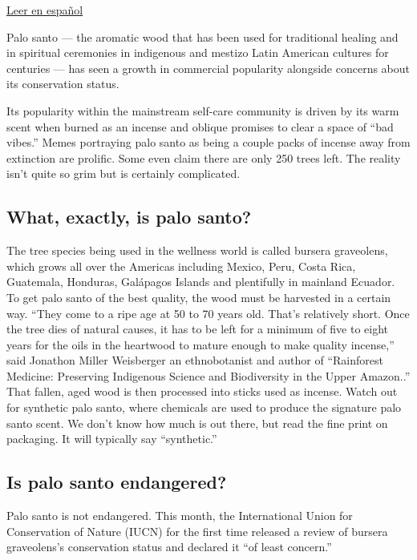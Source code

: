 \href{https://www.nytimes3xbfgragh.onion/es/2019/12/23/espanol/palo-santo-peligro-de-extincion.html}{Leer
en español}

Palo santo --- the aromatic wood that has been used for traditional
healing and in spiritual ceremonies in indigenous and mestizo Latin
American cultures for centuries --- has seen a growth in commercial
popularity alongside concerns about its conservation status.

Its popularity within the mainstream self-care community is driven by
its warm scent when burned as an incense and oblique promises to clear a
space of ``bad vibes.'' Memes portraying palo santo as being a couple
packs of incense away from extinction are prolific. Some even claim
there are only 250 trees left. The reality isn't quite so grim but is
certainly complicated.

\hypertarget{what-exactly-is-palo-santo}{%
\subsection{What, exactly, is palo
santo?}\label{what-exactly-is-palo-santo}}

The tree species being used in the wellness world is called bursera
graveolens, which grows all over the Americas including Mexico, Peru,
Costa Rica, Guatemala, Honduras, Galápagos Islands and plentifully in
mainland Ecuador. To get palo santo of the best quality, the wood must
be harvested in a certain way. ``They come to a ripe age at 50 to 70
years old. That's relatively short. Once the tree dies of natural
causes, it has to be left for a minimum of five to eight years for the
oils in the heartwood to mature enough to make quality incense,'' said
Jonathon Miller Weisberger an ethnobotanist and author of ``Rainforest
Medicine: Preserving Indigenous Science and Biodiversity in the Upper
Amazon..'' That fallen, aged wood is then processed into sticks used as
incense. Watch out for synthetic palo santo, where chemicals are used to
produce the signature palo santo scent. We don't know how much is out
there, but read the fine print on packaging. It will typically say
``synthetic.''

\hypertarget{is-palo-santo-endangered-1}{%
\subsection{Is palo santo
endangered?}\label{is-palo-santo-endangered-1}}

Palo santo is not endangered. This month, the International Union for
Conservation of Nature (IUCN) for the first time released a review of
bursera graveolens's conservation status and declared it ``of least
concern.''

